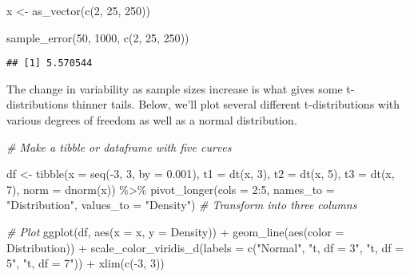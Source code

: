\documentclass[
]{article}
\newenvironment{Shaded}{\begin{snugshade}}{\end{snugshade}}
\newcommand{\AttributeTok}[1]{\textcolor[rgb]{0.77,0.63,0.00}{#1}}
\newcommand{\CommentTok}[1]{\textcolor[rgb]{0.56,0.35,0.01}{\textit{#1}}}
\newcommand{\DecValTok}[1]{\textcolor[rgb]{0.00,0.00,0.81}{#1}}
\newcommand{\FloatTok}[1]{\textcolor[rgb]{0.00,0.00,0.81}{#1}}
\newcommand{\FunctionTok}[1]{\textcolor[rgb]{0.00,0.00,0.00}{#1}}
\newcommand{\NormalTok}[1]{#1}
\newcommand{\OtherTok}[1]{\textcolor[rgb]{0.56,0.35,0.01}{#1}}
\newcommand{\SpecialCharTok}[1]{\textcolor[rgb]{0.00,0.00,0.00}{#1}}
\newcommand{\StringTok}[1]{\textcolor[rgb]{0.31,0.60,0.02}{#1}}
\begin{document}
\begin{Shaded}
\begin{Highlighting}[]
\NormalTok{x }\OtherTok{\textless{}{-}} \FunctionTok{as\_vector}\NormalTok{(}\FunctionTok{c}\NormalTok{(}\DecValTok{2}\NormalTok{, }\DecValTok{25}\NormalTok{, }\DecValTok{250}\NormalTok{))}

\FunctionTok{sample\_error}\NormalTok{(}\DecValTok{50}\NormalTok{, }\DecValTok{1000}\NormalTok{, }\FunctionTok{c}\NormalTok{(}\DecValTok{2}\NormalTok{, }\DecValTok{25}\NormalTok{, }\DecValTok{250}\NormalTok{))}
\end{Highlighting}
\end{Shaded}

\begin{verbatim}
## [1] 5.570544
\end{verbatim}

The change in variability as sample sizes increase is what gives some t-distributions thinner tails. Below, we'll plot several different t-distributions with various degrees of freedom as well as a normal distribution.

\begin{Shaded}
\begin{Highlighting}[]
\CommentTok{\# Make a tibble or dataframe with five curves}

\NormalTok{df }\OtherTok{\textless{}{-}} \FunctionTok{tibble}\NormalTok{(}\AttributeTok{x =} \FunctionTok{seq}\NormalTok{(}\SpecialCharTok{{-}}\DecValTok{3}\NormalTok{, }\DecValTok{3}\NormalTok{, }\AttributeTok{by =} \FloatTok{0.001}\NormalTok{),}
             \AttributeTok{t1 =} \FunctionTok{dt}\NormalTok{(x, }\DecValTok{3}\NormalTok{),}
             \AttributeTok{t2 =} \FunctionTok{dt}\NormalTok{(x, }\DecValTok{5}\NormalTok{),}
             \AttributeTok{t3 =} \FunctionTok{dt}\NormalTok{(x, }\DecValTok{7}\NormalTok{),}
             \AttributeTok{norm =} \FunctionTok{dnorm}\NormalTok{(x)) }\SpecialCharTok{\%\textgreater{}\%} 
  \FunctionTok{pivot\_longer}\NormalTok{(}\AttributeTok{cols =} \DecValTok{2}\SpecialCharTok{:}\DecValTok{5}\NormalTok{, }\AttributeTok{names\_to =} \StringTok{"Distribution"}\NormalTok{, }\AttributeTok{values\_to =} \StringTok{"Density"}\NormalTok{) }\CommentTok{\# Transform into three columns}

\CommentTok{\# Plot}
\FunctionTok{ggplot}\NormalTok{(df, }\FunctionTok{aes}\NormalTok{(}\AttributeTok{x =}\NormalTok{ x, }\AttributeTok{y =}\NormalTok{ Density)) }\SpecialCharTok{+}
  \FunctionTok{geom\_line}\NormalTok{(}\FunctionTok{aes}\NormalTok{(}\AttributeTok{color =}\NormalTok{ Distribution)) }\SpecialCharTok{+}
  \FunctionTok{scale\_color\_viridis\_d}\NormalTok{(}\AttributeTok{labels =} \FunctionTok{c}\NormalTok{(}\StringTok{"Normal"}\NormalTok{, }\StringTok{"t, df = 3"}\NormalTok{, }\StringTok{"t, df = 5"}\NormalTok{, }\StringTok{"t, df = 7"}\NormalTok{)) }\SpecialCharTok{+}
  \FunctionTok{xlim}\NormalTok{(}\FunctionTok{c}\NormalTok{(}\SpecialCharTok{{-}}\DecValTok{3}\NormalTok{, }\DecValTok{3}\NormalTok{))}
\end{Highlighting}
\end{Shaded}
\end{document}
